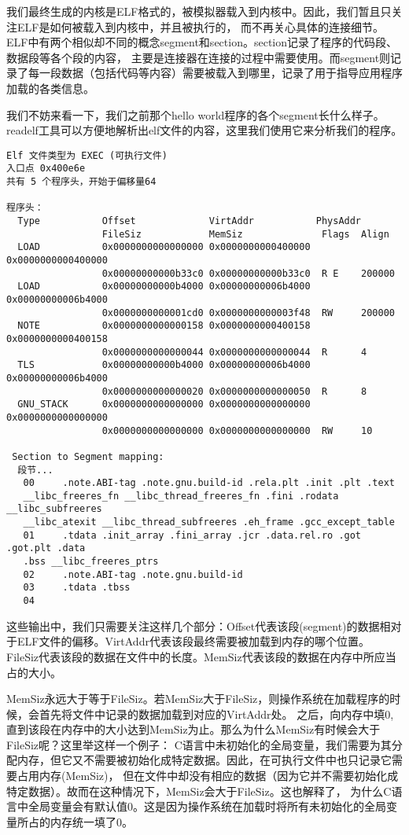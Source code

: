 我们最终生成的内核是ELF格式的，被模拟器载入到内核中。因此，我们暂且只关注ELF是如何被载入到内核中，并且被执行的，
而不再关心具体的连接细节。ELF中有两个相似却不同的概念segment和section。section记录了程序的代码段、数据段等各个段的内容，
主要是连接器在连接的过程中需要使用。而segment则记录了每一段数据（包括代码等内容）需要被载入到哪里，记录了用于指导应用程序加载的各类信息。

我们不妨来看一下，我们之前那个hello world程序的各个segment长什么样子。readelf工具可以方便地解析出elf文件的内容，这里我们使用它来分析我们的程序。

\begin{verbatim}
Elf 文件类型为 EXEC (可执行文件)
入口点 0x400e6e
共有 5 个程序头，开始于偏移量64

程序头：
  Type           Offset             VirtAddr           PhysAddr
                 FileSiz            MemSiz              Flags  Align
  LOAD           0x0000000000000000 0x0000000000400000 0x0000000000400000
                 0x00000000000b33c0 0x00000000000b33c0  R E    200000
  LOAD           0x00000000000b4000 0x00000000006b4000 0x00000000006b4000
                 0x0000000000001cd0 0x0000000000003f48  RW     200000
  NOTE           0x0000000000000158 0x0000000000400158 0x0000000000400158
                 0x0000000000000044 0x0000000000000044  R      4
  TLS            0x00000000000b4000 0x00000000006b4000 0x00000000006b4000
                 0x0000000000000020 0x0000000000000050  R      8
  GNU_STACK      0x0000000000000000 0x0000000000000000 0x0000000000000000
                 0x0000000000000000 0x0000000000000000  RW     10

 Section to Segment mapping:
  段节...
   00     .note.ABI-tag .note.gnu.build-id .rela.plt .init .plt .text 
   __libc_freeres_fn __libc_thread_freeres_fn .fini .rodata __libc_subfreeres 
   __libc_atexit __libc_thread_subfreeres .eh_frame .gcc_except_table 
   01     .tdata .init_array .fini_array .jcr .data.rel.ro .got .got.plt .data 
   .bss __libc_freeres_ptrs 
   02     .note.ABI-tag .note.gnu.build-id 
   03     .tdata .tbss 
   04
\end{verbatim}

这些输出中，我们只需要关注这样几个部分：Offset代表该段(segment)的数据相对于ELF文件的偏移。VirtAddr代表该段最终需要被加载到内存的哪个位置。
FileSiz代表该段的数据在文件中的长度。MemSiz代表该段的数据在内存中所应当占的大小。

\begin{note}
MemSiz永远大于等于FileSiz。若MemSiz大于FileSiz，则操作系统在加载程序的时候，会首先将文件中记录的数据加载到对应的VirtAddr处。
之后，向内存中填0,直到该段在内存中的大小达到MemSiz为止。那么为什么MemSiz有时候会大于FileSiz呢？这里举这样一个例子：
C语言中未初始化的全局变量，我们需要为其分配内存，但它又不需要被初始化成特定数据。因此，在可执行文件中也只记录它需要占用内存(MemSiz)，
但在文件中却没有相应的数据（因为它并不需要初始化成特定数据）。故而在这种情况下，MemSiz会大于FileSiz。这也解释了，
为什么C语言中全局变量会有默认值0。这是因为操作系统在加载时将所有未初始化的全局变量所占的内存统一填了0。
\end{note}


